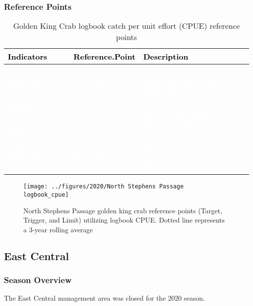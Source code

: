\documentclass[]{article}
\begin{document}
\subsubsection{Reference Points}\label{reference-points-3}

\begin{table}[!h]

\caption{\label{tab:unnamed-chunk-9}Golden King Crab logbook catch per unit effort (CPUE) reference points}
\centering
\begin{tabular}[t]{l|l|l}
\hline
\textcolor{black}{\textbf{Indicators}} & \textcolor{black}{\textbf{Reference.Point}} & \textcolor{black}{\textbf{Description}}\\
\hline
\rowcolor{gray!6}  \rowcolor{olive}  \textcolor{white}{\textbf{Target Reference Point}} & \textcolor{white}{\textbf{1.6 crab/pot}} & \textcolor{white}{\textbf{Average Commercial Logbook CPUE from 2001-2017}}\\
\hline
\rowcolor{orange}  \textcolor{white}{\textbf{Trigger Reference Point}} & \textcolor{white}{\textbf{1.2 crab/pot}} & \textcolor{white}{\textbf{75\% of the Target Reference Point}}\\
\hline
\rowcolor{gray!6}  \rowcolor{red}  \textcolor{white}{\textbf{Limit Reference Point}} & \textcolor{white}{\textbf{0.8 crab/pot}} & \textcolor{white}{\textbf{50\% of the Target Reference Point}}\\
\hline
\end{tabular}
\end{table}

\begin{figure}[H]
\texttt{[image: ../figures/2020/North Stephens Passage logbook\_cpue]} \caption{North Stephens Passage golden king crab reference points (Target, Trigger, and Limit) utilizing logbook CPUE. Dotted line represents a 3-year rolling average}\label{fig:unnamed-chunk-10}
\end{figure}

\subsection{East Central}\label{east-central}

\subsubsection{Season Overview}\label{season-overview-3}

The East Central management area was closed for the 2020 season.
\end{document}
